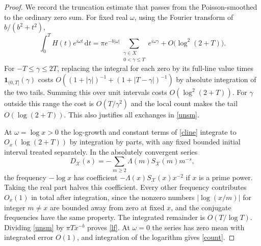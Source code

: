 \documentclass[11pt]{article}
\newcommand{\cX}{\mathcal X}
\newcommand{\dD}{\mathrm d}
\begin{document}
\begin{proof}
We record the truncation estimate that passes from the Poisson-smoothed to the ordinary zero sum. For fixed real $\omega$, using the Fourier transform of $b/(b^2+t^2)$,
\begin{equation}\label{unsm}
 \int_0^T H(t)e^{i\omega t}\,\dD t
 =\pi e^{-b|\omega|}\sum_{\substack{\gamma\in X\\0<\gamma\le T}}e^{i\omega\gamma}
                   +O\bigl(\log^2(2+T)\bigr).
\end{equation}
For $-T\le\gamma\le2T$, replacing the integral for each zero by its full-line value times $\boldsymbol{1}_{(0,T]}(\gamma)$ costs
$O((1+|\gamma|)^{-1}+(1+|T-\gamma|)^{-1})$ by absolute integration of the two tails. Summing this over unit intervals costs $O(\log^2(2+T))$. For $\gamma$ outside this range the cost is $O(T/\gamma^2)$ and the local count makes the tail $O(\log(2+T))$. This also justifies all exchanges in \eqref{unsm}.

At $\omega=\log x>0$ the log-growth and constant terms of \eqref{cline} integrate to $O_x(\log(2+T))$ by integration by parts, with any fixed bounded initial interval treated separately. In the absolutely convergent series
\[
 D_{\cX}(s)=-\sum_{m\ge2}\Lambda(m)S_{\cX}(m)m^{-s},
\]
the frequency $-\log x$ has coefficient $-\Lambda(x)S_{\cX}(x)x^{-2}$ if $x$ is a prime power. Taking the real part halves this coefficient. Every other frequency contributes $O_x(1)$ in total after integration, since the nonzero numbers $|\log(x/m)|$ for integer $m\ne x$ are bounded away from zero at fixed $x$, and the conjugate frequencies have the same property. The integrated remainder is $O(T/\log T)$. Dividing \eqref{unsm} by $\pi Tx^{-b}$ proves \eqref{lf}. At $\omega=0$ the series has zero mean with integrated error $O(1)$, and integration of the logarithm gives \eqref{count}.
\end{proof}
\end{document}
